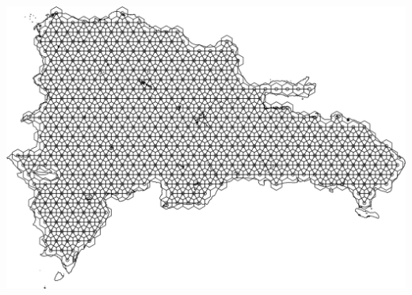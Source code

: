 \documentclass[10pt,landscape,a3paper]{article}
\begin{document}
\begin{center}\includegraphics{img/modelling/lta-esda-1} \end{center}
\end{document}
